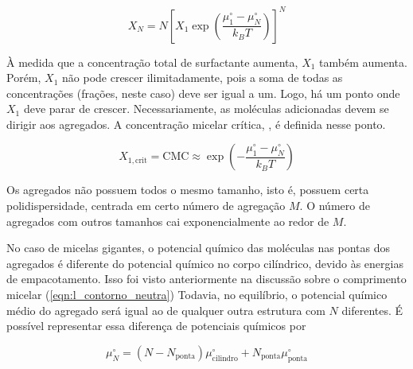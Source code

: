 		\begin{equation}
			X_N = N \left[ X_1 \exp \left(\dfrac{\mu_1^\circ - \mu_N^\circ}{k_B T}\right) \right] ^ N
			\label{eqn:termodinamica_diferenca_potencial_tamanho}
		\end{equation} 
		
		À medida que a concentração total de surfactante aumenta, \(X_1\) também aumenta. Porém, \(X_1\) não pode crescer ilimitadamente, pois a soma de todas as concentrações (frações, neste caso) deve ser igual a um. Logo, há um ponto onde \(X_1\) deve parar de crescer. Necessariamente, as moléculas adicionadas devem se dirigir aos agregados. A concentração micelar crítica, \cmc, é definida nesse ponto.\cite{Israelachvili2011}
		
		\begin{equation}
			X_{1, \mathrm{crit}} = \mathrm{CMC} \approx \exp \left(  - \dfrac{\mu_1^\circ - \mu_N^\circ}{k_B T} \right)
			\label{eqn:cmc_termodinamica}
		\end{equation}  %
		
		Os agregados não possuem todos o mesmo tamanho, isto é, possuem certa polidispersidade, centrada em certo número de agregação \(M\). O número de agregados com outros tamanhos cai exponencialmente ao redor de \(M\).\cite{Giant_Micelles} 
		
		No caso de micelas gigantes, o potencial químico das moléculas nas pontas dos agregados é diferente do potencial químico no corpo cilíndrico, devido às energias de empacotamento. Isso foi visto anteriormente na discussão sobre o comprimento micelar (\autoref{eqn:l_contorno_neutra}) Todavia, no equilíbrio, o potencial químico médio do agregado será igual ao de qualquer outra estrutura com \(N\) diferentes. É possível representar essa diferença de potenciais químicos por \cite{Giant_Micelles}
		
		\begin{equation}
			\mu_N^\circ = \left( N - N_\mathrm{ponta} \right) \mu_\mathrm{cilindro}^\circ + N_\mathrm{ponta}\mu_\mathrm{ponta}^\circ
			\label{eqn:potencial_quimico_MG}
		\end{equation} %
		
%		
		

